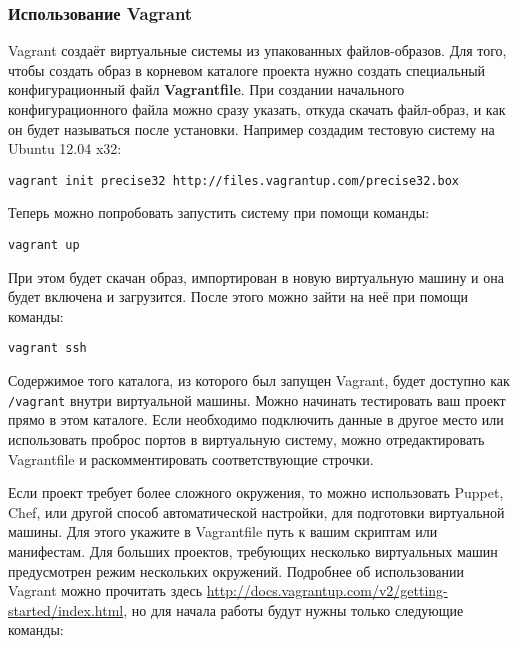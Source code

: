 \subsubsection{Использование Vagrant}

Vagrant создаёт виртуальные системы из упакованных файлов-образов. Для того, чтобы создать образ в корневом каталоге проекта нужно создать специальный конфигурационный файл \textbf{Vagrantfile}. При создании начального конфигурационного файла можно сразу указать, откуда скачать файл-образ, и как он будет называться после установки. Например создадим тестовую систему на Ubuntu 12.04 x32:

\begin{verbatim}
vagrant init precise32 http://files.vagrantup.com/precise32.box
\end{verbatim}

Теперь можно попробовать запустить систему при помощи команды:

\begin{verbatim}
vagrant up
\end{verbatim}

При этом будет скачан образ, импортирован в новую виртуальную машину и она будет включена и загрузится. После этого можно зайти на неё при помощи команды:

\begin{verbatim}
vagrant ssh
\end{verbatim}

Содержимое того каталога, из которого был запущен Vagrant, будет доступно как \texttt{/vagrant} внутри виртуальной машины. Можно начинать тестировать ваш проект прямо в этом каталоге. Если необходимо подключить данные в другое место или использовать проброс портов в виртуальную систему, можно отредактировать Vagrantfile и раскомментировать соответствующие строчки.

Если проект требует более сложного окружения, то можно использовать Puppet, Chef, или другой способ автоматической настройки, для подготовки виртуальной машины. Для этого укажите в Vagrantfile путь к вашим скриптам или манифестам. Для больших проектов, требующих несколько виртуальных машин предусмотрен режим нескольких окружений. Подробнее об использовании Vagrant можно прочитать здесь \url{http://docs.vagrantup.com/v2/getting-started/index.html}, но для начала работы будут нужны только следующие команды:

